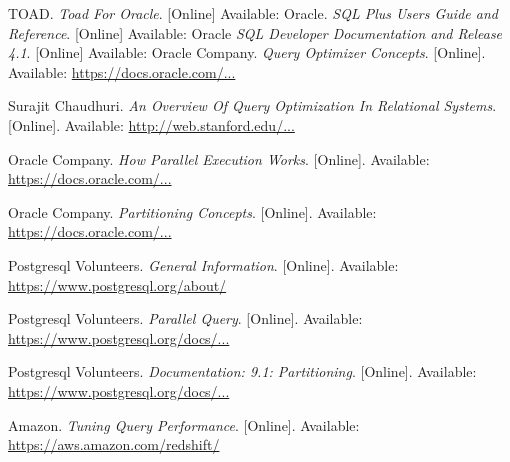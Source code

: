 \documentclass[draftclsnofoot, onecolumn, compsoc, 10pt]{IEEEtran}
\begin{document}
\begin{thebibliography}{9}
TOAD.
\textit{Toad For Oracle}.
[Online]
Available: \href{https://www.quest.com/documents/toad-for-oracle-datasheet-67887.pdf}

Oracle.
\textit{SQL Plus Users Guide and Reference}.
[Online]
Available: \href{https://docs.oracle.com/cd/B19306_01/server.102/b14357/qstart.htm#i1056581}

Oracle
\textit{SQL Developer Documentation and Release 4.1}.
[Online]
Available: \href{https://docs.oracle.com/cd/E55747_01/index.htm}
Oracle Company.
\textit{Query Optimizer Concepts}.
[Online].
Available: \href{https://docs.oracle.com/database/121/TGSQL/tgsql_optcncpt.htm#TGSQL192}{https://docs.oracle.com/...}
 
Surajit Chaudhuri.
\textit{An Overview Of Query Optimization In Relational Systems}.
[Online].
Available: \href{http://web.stanford.edu/class/cs345d-01/rl/chaudhuri98.pdf}{http://web.stanford.edu/...}

Oracle Company.
\textit{How Parallel Execution Works}.
[Online].
Available: \href{https://docs.oracle.com/cd/E11882_01/server.112/e25523/parallel002.htm}{https://docs.oracle.com/...}

Oracle Company.
\textit{Partitioning Concepts}.
[Online].
Available: \href{https://docs.oracle.com/cd/B28359_01/server.111/b32024/partition.htm}{https://docs.oracle.com/...}

Postgresql Volunteers.
\textit{General Information}.
[Online].
Available: \href{https://www.postgresql.org/about/}{https://www.postgresql.org/about/}

Postgresql Volunteers.
\textit{Parallel Query}.
[Online].
Available: \href{https://www.postgresql.org/docs/current/static/parallel-query.html}{https://www.postgresql.org/docs/...}

Postgresql Volunteers.
\textit{Documentation: 9.1: Partitioning}.
[Online].
Available: \href{https://www.postgresql.org/docs/9.1/static/ddl-partitioning.html}{https://www.postgresql.org/docs/...}

Amazon.
\textit{Tuning Query Performance}.
[Online].
Available: \href{https://aws.amazon.com/redshift/}{https://aws.amazon.com/redshift/}


\end{thebibliography}
\end{document}
